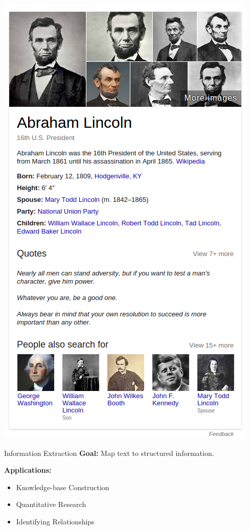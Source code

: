 \documentclass{beamer}
\begin{document}
\begin{frame}
  \begin{center}
    \includegraphics[height=\textheight]{abelincoln}
  \end{center}
\end{frame}

\begin{frame}{Information Extraction}
  \textbf{Goal:} Map text to structured information.
  
  \textbf{Applications:} 
  \begin{itemize}
  \item Knowledge-base Construction
    \air 
  \item Quantitative Research
    \air 
  \item Identifying Relationships
  \end{itemize}
\end{frame}
\end{document}
